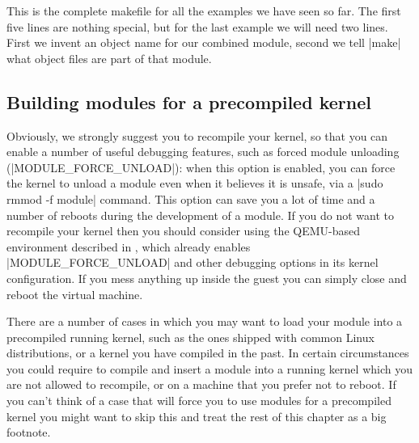 \documentclass[10pt, oneside]{book}
\begin{document}

This is the complete makefile for all the examples we have seen so far.
The first five lines are nothing special, but for the last example we will need two lines.
First we invent an object name for our combined module, second we tell \sh|make| what object files are part of that module.

\subsection{Building modules for a precompiled kernel}
\label{sec:precompiled}
Obviously, we strongly suggest you to recompile your kernel, so that you can enable a number of useful debugging features,
such as forced module unloading (\cpp|MODULE_FORCE_UNLOAD|): when this option is enabled,
you can force the kernel to unload a module even when it believes it is unsafe, via a \sh|sudo rmmod -f module| command.
This option can save you a lot of time and a number of reboots during the development of a module.
If you do not want to recompile your kernel then you should consider using the QEMU-based
environment described in , which already enables
\cpp|MODULE_FORCE_UNLOAD| and other debugging options in its kernel configuration.
If you mess anything up inside the guest you can simply close and reboot the virtual machine.

There are a number of cases in which you may want to load your module into a precompiled running kernel,
such as the ones shipped with common Linux distributions, or a kernel you have compiled in the past.
In certain circumstances you could require to compile and insert a module into a running kernel which you are not allowed to recompile,
or on a machine that you prefer not to reboot.
If you can't think of a case that will force you to use modules for a precompiled kernel you might want to skip this and treat the rest of this chapter as a big footnote.
\end{document}
